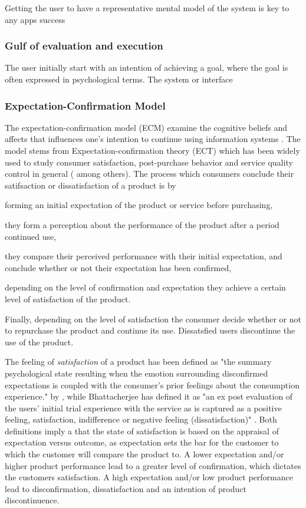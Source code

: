 Getting the user to have a representative mental model of the system is key to any apps success

\subsubsection{Gulf of evaluation and execution}
The user initially start with an intention of achieving a goal, where the goal is often expressed in psychological terms. The system or interface

\subsubsection{Expectation-Confirmation Model}
The expectation-confirmation model (ECM) examine the cognitive beliefs and affects that influences one's intention to continue using information systems \cite{Bhattacherjee2001a}. The model stems from Expectation-confirmation theory (ECT) which has been widely used to study consumer satisfaction, post-purchase behavior and service quality control in general (\cite{Anderson1993} \cite{Oliver1981} among others). The process which consumers conclude their satifsaction or dissatisfaction of a product is by \begin{enumerate*}[label=(\(\arabic*\))]
  \item forming an initial expectation of the product or service before purchasing,
  \item they form a perception about the performance of the product after a period continued use,
  \item they compare their perceived performance with their initial expectation, and conclude whether or not their expectation has been confirmed,
  \item depending on the level of confirmation and expectation they achieve a certain level of satisfaction of the product.
  \item Finally, depending on the level of satisfaction the consumer decide whether or not to repurchase the product and continue its use. Dissatsfied users discontinue the use of the product.
\end{enumerate*}

The feeling of \textit{satisfaction} of a product has been defined as "the summary psychological state resulting when the emotion surrounding disconfirmed expectations is coupled with the consumer's prior feelings about the consumption experience." by \cite{Oliver1981}, while Bhattacherjee has defined it as "an ex post evaluation of the users’ initial trial experience with the service as is captured as a positive feeling, satisfaction, indifference or negative feeling (dissatisfaction)" \cite{Bhattacherjee2001}. Both definitions imply a that the state of satisfaction is based on the appraisal of expectation versus outcome, as expectation sets the bar for the customer to which the customer will compare the product to. A lower expectation and/or higher product performance lead to a greater level of confirmation, which dictates the customers satisfaction. A high expectation and/or low product performance lead to disconfirmation, dissatisfaction and an intention of product discontinuence.

